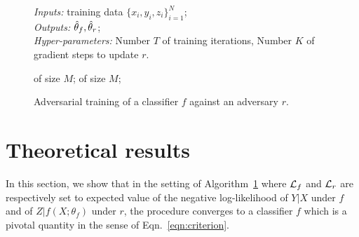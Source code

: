 \documentclass[twocolumn,superscriptaddress,aps]{revtex4-1}
\theoremstyle{plain}
\begin{document}
\begin{figure}
    \begin{minipage}{\linewidth}
    \begin{algorithm}[H]
    \caption{Adversarial training of a classifier $f$ against an adversary $r$.}

    \begin{flushleft}
        {\it Inputs:} training data $\{ x_i, y_i, z_i \}_{i=1}^N$;\\
        {\it Outputs:} $\smash{\hat\theta_f}, \smash{\hat\theta_r}$;\\
        {\it Hyper-parameters:} Number $T$ of training iterations,
                                Number $K$ of gradient steps to update $r$.
    \end{flushleft}

    \label{alg:adversarial-training}
    \begin{algorithmic}[1]
             
                 of size $M$;
            \EndFor
             of size $M$; 
        \EndFor
    \end{algorithmic}
    \end{algorithm}
    \end{minipage}
\end{figure}



\section{Theoretical results}
\label{sec:theory}

In this section, we show that in the setting of
Algorithm~\ref{alg:adversarial-training} where ${\cal L}_f$ and ${\cal L}_r$ are
respectively set to expected value of the negative log-likelihood of $Y|X$ under
$f$ and of $Z|f(X;\theta_f)$ under $r$, the procedure converges to a classifier
$f$ which is a pivotal quantity in the sense of Eqn.~\ref{eqn:criterion}.
\end{document}
